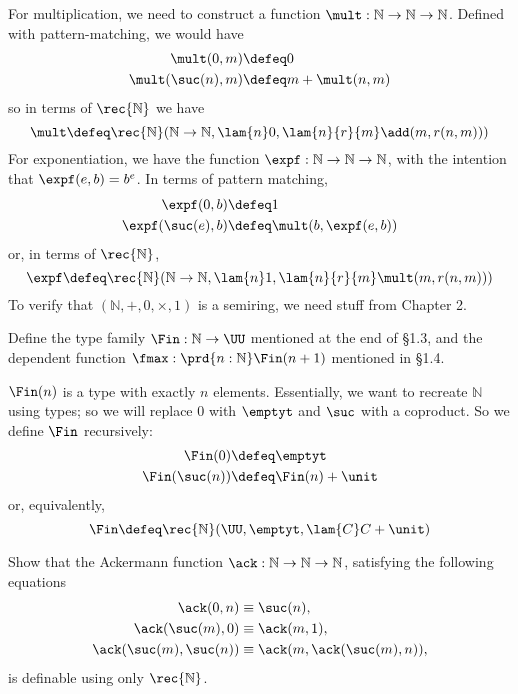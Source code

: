 \soln For multiplication, we need to construct a function $\mult : \mathbb{N}
\to \mathbb{N} \to \mathbb{N}$.  Defined with pattern-matching, we would have
\begin{align*}
  \mult(0, m) &\defeq 0 \\
  \mult(\suc(n), m) &\defeq m + \mult(n, m)
\end{align*}
so in terms of $\rec{\mathbb{N}}$ we have
\[
  \mult \defeq 
  \rec{\mathbb{N}}(
  \mathbb{N} \to \mathbb{N},
  \lam{n}0,
  \lam{n}{r}{m}\add(m, r(n, m))
  )
\]
For exponentiation, we have the function $\expf: \mathbb{N} \to \mathbb{N} \to
\mathbb{N}$, with the intention that $\expf(e, b) = b^{e}$.  In terms of pattern
matching,
\begin{align*}
  \expf(0, b) &\defeq 1 \\
  \expf(\suc(e), b) &\defeq \mult(b, \expf(e, b))
\end{align*}
or, in terms of $\rec{\mathbb{N}}$,
\[
  \expf \defeq \rec{\mathbb{N}}(
    \mathbb{N} \to \mathbb{N},
    \lam{n}1,
    \lam{n}{r}{m}\mult(m, r(n, m))
  )
\]
To verify that $(\mathbb{N}, +, 0, \times, 1)$ is a semiring, we need stuff
from Chapter 2.


  Define the type family $\Fin : \mathbb{N} \to \UU$
mentioned at the end of \S1.3, and the dependent function $\fmax :
\prd{n : \mathbb{N}} \Fin(n + 1)$ mentioned in \S1.4.

\soln  $\Fin(n)$ is a type with exactly $n$ elements.  Essentially, we want to
recreate $\mathbb{N}$ using types; so we will replace $0$ with $\emptyt$ and
$\suc$ with a coproduct.  So we define $\Fin$ recursively:
\begin{align*}
  \Fin(0) &\defeq \emptyt \\
  \Fin(\suc(n)) &\defeq \Fin(n) + \unit
\end{align*}
or, equivalently,
\[
  \Fin \defeq \rec{\mathbb{N}}(\UU, \emptyt, \lam{C}C+\unit)
\]




  Show that the Ackermann function $\ack : \mathbb{N} \to
\mathbb{N} \to \mathbb{N}$,
satisfying the following equations
\begin{align*}
  \ack(0, n) &\equiv \suc(n), \\
  \ack(\suc(m), 0) &\equiv \ack(m, 1), \\
  \ack(\suc(m), \suc(n)) &\equiv \ack(m, \ack(\suc(m), n)),
\end{align*}
is definable using only $\rec{\mathbb{N}}$.

